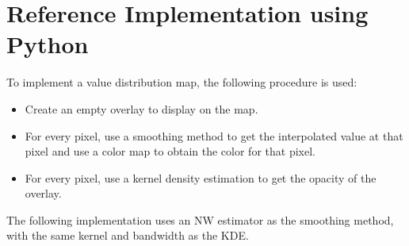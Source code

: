 \section{Reference Implementation using Python}

To implement a value distribution map, the following procedure is used:
\begin{itemize}
    \item Create an empty overlay to display on the map.
    \item For every pixel, use a smoothing method to get the interpolated value at that pixel and use a color map to obtain the color for that pixel.
    \item For every pixel, use a kernel density estimation to get the opacity of the overlay.
\end{itemize}

The following implementation uses an NW estimator as the smoothing method, with the same kernel and bandwidth as the KDE\@.

